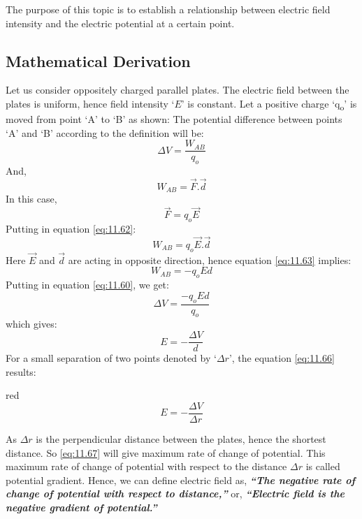 The purpose of this topic is to establish a relationship between electric
field intensity and the electric potential at a certain point.

\subsection*{Mathematical Derivation}
Let us consider oppositely charged parallel plates.
The electric field between the plates is uniform, hence field intensity
`$E$' is constant. Let a positive charge ‘q\textsubscript{o}’ is moved
from point ‘A’ to ‘B’ as shown:
The potential difference between points ‘A’ and ‘B’ according to the
definition will be:
\begin{equation}\label{eq:11.60}
  \Delta V = \frac{W_{AB}}{q_{o}}  
\end{equation}
And,
\begin{equation}\label{eq:11.61}
  W_{AB} = \vec{F}.\vec{d} 
\end{equation}
In this case, 
\begin{equation}\label{eq:11.62}
  \vec{F} = q_{o}\vec{E}
\end{equation}
Putting in equation \ref{eq:11.62}:
\begin{equation}\label{eq:11.63}
  W_{AB} = q_{o}\vec{E}.\vec{d} 
\end{equation}
Here $\vec{E}$ and $\vec{d}$ are acting in opposite direction, hence equation
\ref{eq:11.63} implies:
\begin{equation}\label{eq:11.64}
  W_{AB} = -q_{o}Ed 
\end{equation}
Putting in equation \ref{eq:11.60}, we get:
\begin{equation}\label{eq:11.65}
  \Delta V = \frac{-q_{o}Ed}{q_{o}}  
\end{equation}
which gives:
\begin{equation}\label{eq:11.66}
  E = -\frac{\Delta V}{d}
\end{equation}
For a small separation of two points denoted by `$\Delta r$', the
equation \ref{eq:11.66} results:
\begin{mybox}{red}{}
\begin{equation}\label{eq:11.67}
  E = -\frac{\Delta V}{\Delta r}
\end{equation}
\end{mybox}
As $\Delta r$ is the perpendicular distance between the plates, hence the
shortest distance. So \ref{eq:11.67} will give maximum rate of change of potential.
This maximum rate of change of potential with respect to the distance $\Delta r$
is called potential gradient. Hence, we can define electric field as,
\textit{\textbf{“The negative rate of change of potential with respect
to distance,”}} or, \textit{\textbf{“Electric field is the negative gradient of potential.”}}
